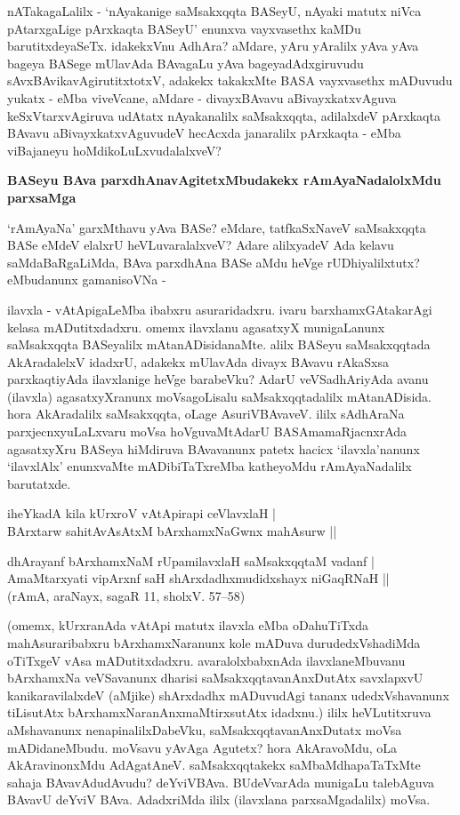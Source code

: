nATakagaLalilx - `nAyakanige saMsakxqqta BASeyU, nAyaki matutx niVca pAtarxgaLige pArxkaqta BASeyU' enunxva vayxvasethx kaMDu barutitxdeyaSeTx. idakekxVnu AdhAra? aMdare, yAru yAralilx yAva yAva bageya BASege mUlavAda BAvagaLu yAva bageyadAdxgiruvudu sAvxBAvikavAgirutitxtotxV, adakekx takakxMte BASA vayxvasethx mADuvudu yukatx - eMba viveVcane, aMdare - divayxBAvavu aBivayxkatxvAguva keSxVtarxvAgiruva udAtatx nAyakanalilx saMsakxqqta, adilalxdeV pArxkaqta BAvavu aBivayxkatxvAguvudeV hecAcxda janaralilx pArxkaqta - eMba viBajaneyu hoMdikoLuLxvudalalxveV?

{\bigskip
\noindent
{\large\bf BASeyu BAva parxdhAnavAgitetxMbudakekx rAmAyaNadalolxMdu parxsaMga}}\label{page13}
\medskip

\noindent
`rAmAyaNa' garxMthavu yAva BASe? eMdare, tatfkaSxNaveV saMsakxqqta BASe eMdeV elalxrU heVLuvaralalxveV? Adare alilxyadeV Ada kelavu saMdaBaRgaLiMda, BAva parxdhAna BASe aMdu heVge rUDhiyalilxtutx? eMbudanunx gamanisoVNa -

ilavxla - vAtApigaLeMba ibabxru asuraridadxru. ivaru barxhamxGAtakarAgi kelasa mADutitxdadxru. omemx ilavxlanu agasatxyX munigaLanunx saMsakxqqta BASeyalilx mAtanADisidanaMte. alilx BASeyu saMsakxqqtada AkAradalelxV idadxrU, adakekx mUlavAda divayx BAvavu rAkaSxsa parxkaqtiyAda ilavxlanige heVge barabeVku? AdarU veVSadhAriyAda avanu (ilavxla) agasatxyXranunx moVsagoLisalu saMsakxqqtadalilx mAtanADisida. hora AkAradalilx saMsakxqqta, oLage AsuriVBAvaveV. ililx sAdhAraNa parxjecnxyuLaLxvaru moVsa hoVguvaMtAdarU BASAmamaRjacnxrAda agasatxyXru BASeya hiMdiruva BAvavanunx patetx hacicx `ilavxla'nanunx `ilavxlAlx' enunxvaMte mADibiTaTxreMba katheyoMdu rAmAyaNadalilx barutatxde.

\begin{shloka}
iheYkadA kila kUrxroV vAtApirapi ceVlavxlaH |\\\label{13}
BArxtarw sahitAvAsAtxM bArxhamxNaGwnx mahAsurw ||\\
\end{shloka} 

\begin{shloka}
dhArayanf bArxhamxNaM rUpamilavxlaH saMsakxqqtaM vadanf |\\
AmaMtarxyati vipArxnf saH shArxdadhxmudidxshayx niGaqRNaH ||\\[4pt]
\hfill{(rAmA, araNayx, sagaR 11, sholxV. 57--58)}
\end{shloka}  

\noindent
(omemx, kUrxranAda vAtApi matutx ilavxla eMba oDahuTiTxda mahAsuraribabxru bArxhamxNaranunx kole mADuva durudedxVshadiMda oTiTxgeV vAsa mADutitxdadxru. avaralolxbabxnAda ilavxlaneMbuvanu bArxhamxNa veVSavanunx dharisi saMsakxqqtavanAnxDutAtx savxlapxvU kanikaravilalxdeV (aMjike) shArxdadhx mADuvudAgi tananx udedxVshavanunx tiLisutAtx bArxhamxNaranAnxmaMtirxsutAtx idadxnu.) ililx heVLutitxruva aMshavanunx nenapinalilxDabeVku, saMsakxqqtavanAnxDutatx moVsa mADidaneMbudu. moVsavu yAvAga Agutetx? hora AkAravoMdu, oLa AkAravinonxMdu AdAgatAneV. saMsakxqqtakekx saMbaMdhapaTaTxMte sahaja BAvavAdudAvudu? deYviVBAva. BUdeVvarAda munigaLu talebAguva BAvavU deYviV BAva. AdadxriMda ililx (ilavxlana parxsaMgadalilx) moVsa.

